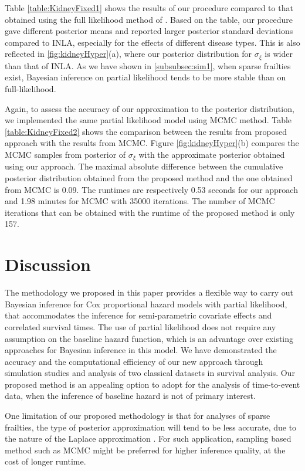\documentclass[ba]{imsart}
\begin{document}
Table \ref{table:KidneyFixed1} shows the results of our procedure compared to that obtained using the full likelihood method of \cite{inlacoxph}. Based on the table, our procedure gave different posterior means and reported larger posterior standard deviations compared to INLA, especially for the effects of different disease types. This is also reflected in \ref{fig:kidneyHyper}(a), where our posterior distribution for $\sigma_{\xi}$ is wider than that of INLA. As we have shown in \ref{subsubsec:sim1}, when sparse frailties exist, Bayesian inference on partial likelihood tends to be more stable than on full-likelihood.

Again, to assess the accuracy of our approximation to the posterior distribution, we implemented the same partial likelihood model using MCMC method. Table \ref{table:KidneyFixed2} shows the comparison between the results from proposed approach with the results from MCMC. Figure \ref{fig:kidneyHyper}(b) compares the MCMC samples from posterior of $\sigma_{\xi}$ with the approximate posterior obtained using our approach. The maximal absolute difference between the cumulative posterior distribution obtained from the proposed method and the one obtained from MCMC is 0.09. The runtimes are respectively 0.53 seconds for our approach and 1.98 minutes for MCMC with 35000 iterations. The number of MCMC iterations that can be obtained with the runtime of the proposed method is only 157.

\section{Discussion}\label{sec:discussion}

The methodology we proposed in this paper provides a flexible way to carry out Bayesian inference for Cox proportional hazard models with partial likelihood, that accommodates the inference for semi-parametric covariate effects and correlated survival times. The use of partial likelihood does not require any assumption on the baseline hazard function, which is an advantage over existing approaches for Bayesian inference in this model. We have demonstrated the accuracy and the computational efficiency of our new approach through simulation studies and analysis of two classical datasets in survival analysis. Our proposed method is an appealing option to adopt for the analysis of time-to-event data, when the inference of baseline hazard is not of primary interest.

One limitation of our proposed methodology is that for analyses of sparse frailties, the type of posterior approximation will tend to be less accurate, due to the nature of the Laplace approximation \citep{Ogden2013ASR}. For such application, sampling based method such as MCMC might be preferred for higher inference quality, at the cost of longer runtime. 
\end{document}

